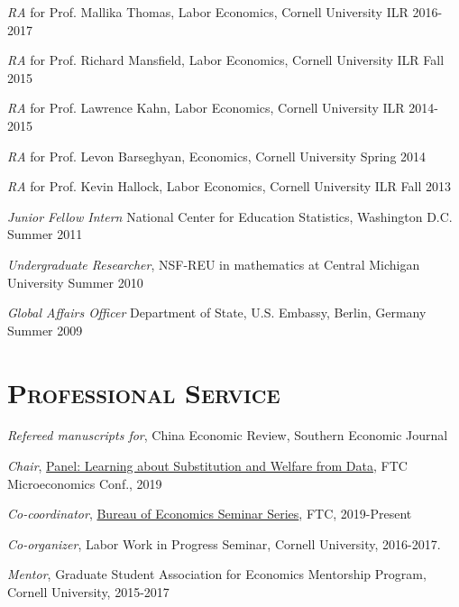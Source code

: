 \documentclass[10pt,letterpaper]{article}
\renewenvironment{itemize}{
  \begin{list}{}{
    \setlength{\leftmargin}{1.5em}
    \setlength{\itemsep}{0.25em}
    \setlength{\parskip}{0pt}
    \setlength{\parsep}{0.25em}
  }
}{
  \end{list}
}
\begin{document}
\begin{itemize}  
  \item {\it RA} for Prof. Mallika Thomas, Labor Economics, Cornell University ILR \hfill 2016-2017
  \item {\it RA} for Prof. Richard Mansfield, Labor Economics, Cornell University ILR \hfill Fall 2015
    \item {\it RA} for Prof. Lawrence Kahn, Labor Economics, Cornell University ILR \hfill  2014-2015
      \item {\it RA} for Prof. Levon Barseghyan, Economics, Cornell University \hfill Spring 2014
        \item {\it RA} for Prof. Kevin Hallock, Labor Economics, Cornell University ILR \hfill  Fall 2013
  \item {\it Junior Fellow Intern} National Center for Education Statistics, Washington D.C. \hfill Summer 2011
  \item {\it Undergraduate Researcher}, NSF-REU in mathematics at Central Michigan University \hfill Summer 2010 
  \item {\it Global Affairs Officer} Department of State, U.S. Embassy, Berlin, Germany \hfill Summer 2009
\end{itemize}


\section*{\scshape Professional Service}
\begin{itemize} 
\item 
\item {\it Refereed manuscripts for}, China Economic Review, Southern Economic Journal
\item {\it Chair}, \href{https://www.ftc.gov/news-events/events-calendar/twelfth-annual-federal-trade-commission-microeconomics-conference}{Panel: Learning about Substitution and Welfare from Data}, FTC Microeconomics Conf., 2019
\item {\it Co-coordinator}, \href{https://www.ftc.gov/about-ftc/bureaus-offices/bureau-economics/conferences-seminars/bureau-economics-seminar-series}{Bureau of Economics Seminar Series}, FTC, 2019-Present
\item {\it Co-organizer}, Labor Work in Progress Seminar, Cornell University, 2016-2017.
\item {\it Mentor}, Graduate Student Association for Economics Mentorship Program, Cornell University, 2015-2017
\end{itemize}
\end{document}
